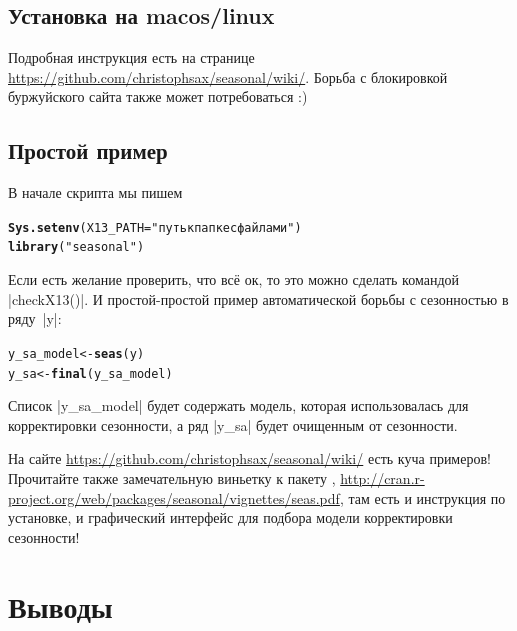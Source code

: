 \documentclass[final,pdftex]{../../template/epsilonj}\usepackage[]{graphicx}\usepackage[]{color}
\makeatletter
\newcommand{\hlstr}[1]{\textcolor[rgb]{0.192,0.494,0.8}{#1}}%
\newcommand{\hlstd}[1]{\textcolor[rgb]{0.345,0.345,0.345}{#1}}%
\newcommand{\hlkwb}[1]{\textcolor[rgb]{0.69,0.353,0.396}{#1}}%
\newcommand{\hlkwc}[1]{\textcolor[rgb]{0.333,0.667,0.333}{#1}}%
\newcommand{\hlkwd}[1]{\textcolor[rgb]{0.737,0.353,0.396}{\textbf{#1}}}%
\newenvironment{kframe}{%
 \def\at@end@of@kframe{}%
 \ifinner\ifhmode%
  \def\at@end@of@kframe{\end{minipage}}%
  \begin{minipage}{\columnwidth}%
 \fi\fi%
 \def\FrameCommand##1{\hskip\@totalleftmargin \hskip-\fboxsep
 \colorbox{shadecolor}{##1}\hskip-\fboxsep
     \hskip-\linewidth \hskip-\@totalleftmargin \hskip\columnwidth}%
 \MakeFramed {\advance\hsize-\width
   \@totalleftmargin\z@ \linewidth\hsize
   \@setminipage}}%
 {\par\unskip\endMakeFramed%
 \at@end@of@kframe}
\newenvironment{knitrout}{}{} %
\makeatother
\begin{document}
\subsection{Установка на macos/linux}

Подробная инструкция есть на странице \url{https://github.com/christophsax/seasonal/wiki/}. Борьба с блокировкой буржуйского сайта также может потребоваться :)


\subsection{Простой пример}
В начале скрипта   мы пишем
\begin{knitrout}
\color{fgcolor}\begin{kframe}
\begin{alltt}
\hlkwd{Sys.setenv}\hlstd{(}\hlkwc{X13_PATH} \hlstd{=}\hlstr{"путь к папке с файлами"}\hlstd{)}
\hlkwd{library}\hlstd{(}\hlstr{"seasonal"}\hlstd{)}
\end{alltt}
\end{kframe}
\end{knitrout}

Если есть желание проверить, что всё ок, то это можно сделать командой \code|checkX13()|. И простой-простой пример автоматической борьбы с сезонностью в ряду~\code|y|:
\begin{knitrout}
\color{fgcolor}\begin{kframe}
\begin{alltt}
\hlstd{y_sa_model} \hlkwb{<-} \hlkwd{seas}\hlstd{(y)}
\hlstd{y_sa} \hlkwb{<-} \hlkwd{final}\hlstd{(y_sa_model)}
\end{alltt}
\end{kframe}
\end{knitrout}

Список \code|y_sa_model| будет содержать модель, которая использовалась для корректировки сезонности, а ряд \code|y_sa| будет очищенным от сезонности.

На сайте \url{https://github.com/christophsax/seasonal/wiki/} есть куча примеров! Прочитайте также замечательную виньетку к пакету , \url{http://cran.r-project.org/web/packages/seasonal/vignettes/seas.pdf}, там есть и инструкция по установке, и графический интерфейс для подбора модели корректировки сезонности!


\section{Выводы}
\end{document}
